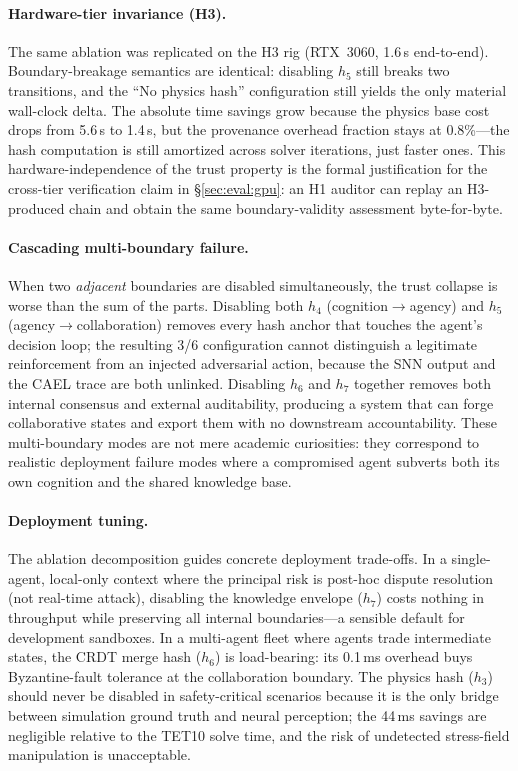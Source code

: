 \documentclass[sigchi-a]{acmart}
\begin{document}
\paragraph{Hardware-tier invariance (H3).}
The same ablation was replicated on the H3 rig (RTX~3060, 1.6\,s
end-to-end).  Boundary-breakage semantics are identical: disabling
$h_5$ still breaks two transitions, and the ``No physics hash''
configuration still yields the only material wall-clock delta.  The
absolute time savings grow because the physics base cost drops from
5.6\,s to 1.4\,s, but the provenance overhead fraction stays at
0.8\%---the hash computation is still amortized across solver
iterations, just faster ones.  This hardware-independence of the
trust property is the formal justification for the cross-tier
verification claim in \S\ref{sec:eval:gpu}: an H1 auditor can replay
an H3-produced chain and obtain the same boundary-validity
assessment byte-for-byte.

\paragraph{Cascading multi-boundary failure.}
When two \emph{adjacent} boundaries are disabled simultaneously,
the trust collapse is worse than the sum of the parts.  Disabling
both $h_4$ (cognition$\to$agency) and $h_5$ (agency$\to$collaboration)
removes every hash anchor that touches the agent's decision loop;
the resulting 3/6 configuration cannot distinguish a legitimate
reinforcement from an injected adversarial action, because the SNN
output and the CAEL trace are both unlinked.  Disabling $h_6$ and
$h_7$ together removes both internal consensus and external auditability,
producing a system that can forge collaborative states and export
them with no downstream accountability.  These multi-boundary modes
are not mere academic curiosities: they correspond to realistic
deployment failure modes where a compromised agent subverts both
its own cognition and the shared knowledge base.

\paragraph{Deployment tuning.}
The ablation decomposition guides concrete deployment trade-offs.
In a single-agent, local-only context where the principal risk is
post-hoc dispute resolution (not real-time attack), disabling the
knowledge envelope ($h_7$) costs nothing in throughput while preserving
all internal boundaries---a sensible default for development sandboxes.
In a multi-agent fleet where agents trade intermediate states, the
CRDT merge hash ($h_6$) is load-bearing: its 0.1\,ms overhead buys
Byzantine-fault tolerance at the collaboration boundary.  The
physics hash ($h_3$) should never be disabled in safety-critical
scenarios because it is the only bridge between simulation ground
truth and neural perception; the 44\,ms savings are negligible relative
to the TET10 solve time, and the risk of undetected stress-field
manipulation is unacceptable.
\end{document}
